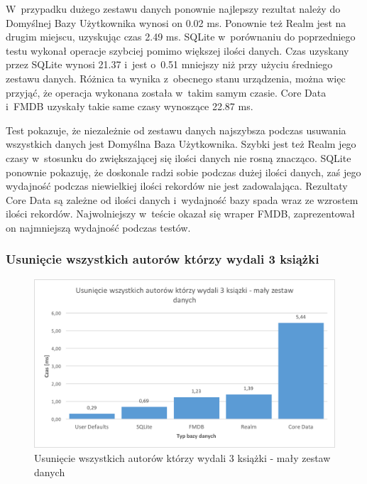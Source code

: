  W~przypadku dużego zestawu danych ponownie najlepszy rezultat należy do Domyślnej Bazy Użytkownika wynosi on 0.02 ms. Ponownie też Realm jest na drugim miejscu, uzyskując czas 2.49 ms. SQLite w~porównaniu do poprzedniego testu wykonał operacje szybciej pomimo większej ilości danych. Czas uzyskany przez SQLite wynosi 21.37 i~jest o~0.51 mniejszy niż przy użyciu średniego zestawu danych. Różnica ta wynika z~obecnego stanu urządzenia, można więc przyjąć, że operacja wykonana została w~takim samym czasie. Core Data i~FMDB uzyskały takie same czasy wynoszące 22.87 ms. 

Test pokazuje, że niezależnie od zestawu danych najszybsza podczas usuwania wszystkich danych jest Domyślna Baza Użytkownika. Szybki jest też Realm jego czasy w~stosunku do zwiększającej się ilości danych nie rosną znacząco. SQLite ponownie pokazuję, że doskonale radzi sobie podczas dużej ilości danych, zaś jego wydajność podczas niewielkiej ilości rekordów nie jest zadowalająca. Rezultaty Core Data są zależne od ilości danych i~wydajność bazy spada wraz ze wzrostem ilości rekordów. Najwolniejszy w~teście okazał się wraper FMDB, zaprezentował on najmniejszą wydajność podczas testów. 

\subsubsection{Usunięcie wszystkich autorów którzy wydali 3 książki}

\begin{figure}[H]
    \centering\includegraphics[width=\linewidth]{img/delete_data/delete_by_author/delete_by_author_small_test.png}
    \caption{Usunięcie wszystkich autorów którzy wydali 3 książki - mały zestaw danych}
    \label{img: delete-by-author-small}
\end{figure}

